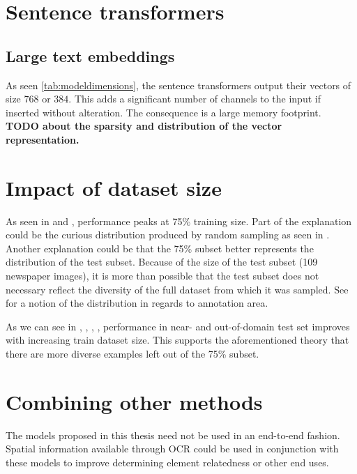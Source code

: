 \documentclass[oneside, english, bibtex]{kththesis}
\begin{document}
\section{Sentence transformers}

\subsection{Large text embeddings} 

As seen \autoref{tab:modeldimensions}, the sentence transformers output their vectors of size $768$ or $384$. This adds a significant number of channels to the input if inserted without alteration. The consequence is a large memory footprint. \textbf{TODO about the sparsity and distribution of the vector representation.}

\section{Impact of dataset size}

As seen in  and , performance peaks at 75\% training size. Part of the explanation could be the curious distribution produced by random sampling as seen in . Another explanation could be that the 75\% subset better represents the distribution of the test subset. Because of the size of the test subset (109 newspaper images), it is more than possible that the test subset does not necessary reflect the diversity of the full dataset from which it was sampled. See  for a notion of the distribution in regards to annotation area.

As we can see in , , , , performance in near- and out-of-domain test set improves with increasing train dataset size. This supports the aforementioned theory that there are more diverse examples left out of the 75\% subset.

\section{Combining other methods}

The models proposed in this thesis need not be used in an end-to-end fashion. Spatial information available through OCR could be used in conjunction with these models to improve determining element relatedness or other end uses. 
\end{document}
